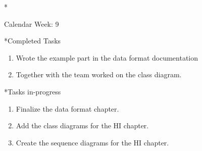 \documentclass[11pt,a4paper]{article}
\begin{document}
\newpage
\begin{section}*{Calendar Week: 9  \hfill \date{05 March, 2021}}
 \begin{refsection}

       \begin{subsection}*{Completed Tasks}
             \begin{enumerate}
                   \item Wrote the example part in the data format documentation
                   \item Together with the team worked on the class diagram.
             \end{enumerate}
       \end{subsection}

       \begin{subsection}*{Tasks in-progress}
             \begin{enumerate}
                   \item Finalize the data format chapter.
                   \item Add the class diagrams for the HI chapter.
                   \item Create the sequence diagrams for the HI chapter.
             \end{enumerate}
       \end{subsection}

 \end{refsection}
\end{section}
\end{document}
